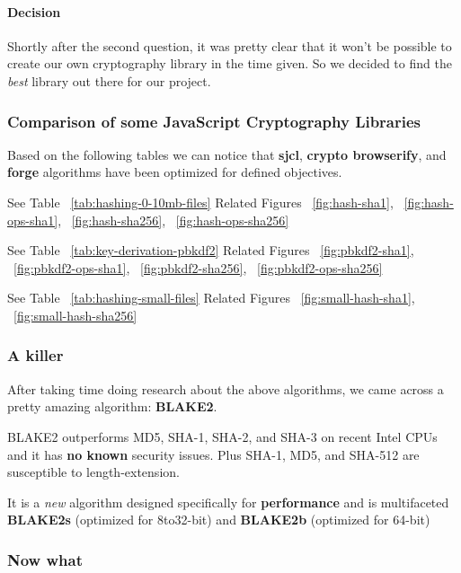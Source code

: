 \paragraph{Decision} Shortly after the second question, it was pretty clear that it won't be possible to create our own cryptography library in the time given. So we decided to find the \textit{best} library out there for our project.

\subsubsection{Comparison of some JavaScript Cryptography Libraries}

Based on the following tables we can notice that \textbf{sjcl}\cite{Stark2012SymmetricJavascript}, \textbf{crypto browserify}\cite{Tarr2013Crypto-Browserify}, and \textbf{forge}\cite{DigitalBazaar2016Forge} algorithms have been optimized for defined objectives.

See Table ~\ref{tab:hashing-0-10mb-files}
Related Figures ~\ref{fig:hash-sha1}, ~\ref{fig:hash-ops-sha1}, ~\ref{fig:hash-sha256}, ~\ref{fig:hash-ops-sha256}

See Table ~\ref{tab:key-derivation-pbkdf2}
Related Figures ~\ref{fig:pbkdf2-sha1}, ~\ref{fig:pbkdf2-ops-sha1}, ~\ref{fig:pbkdf2-sha256}, ~\ref{fig:pbkdf2-ops-sha256}

See Table ~\ref{tab:hashing-small-files}
Related Figures ~\ref{fig:small-hash-sha1}, ~\ref{fig:small-hash-sha256}

\subsubsection{A killer}

After taking time doing research about the above algorithms, we came across a pretty amazing algorithm: \textbf{BLAKE2}\cite{Guo2014AnalysisBLAKE2,SaarinenM-J.2015TheMAC}.

BLAKE2 outperforms MD5, SHA-1, SHA-2, and SHA-3 on recent Intel CPUs and it has \textbf{no known} security issues. Plus SHA-1, MD5, and SHA-512 are susceptible to length-extension.

It is a \textit{new} algorithm designed specifically for \textbf{performance} and is multifaceted \textbf{BLAKE2s} (optimized for 8to32-bit) and \textbf{BLAKE2b} (optimized for 64-bit)

\subsubsection{Now what}

